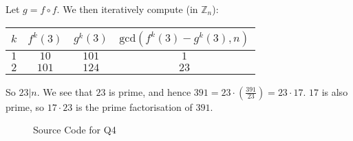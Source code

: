 Let $g=f\circ f$. We then iteratively compute (in $\mathbb{Z}_n$):

\begin{tabular}{|c|c|c|c|}
\hline
$k$ &$f^k(3)$ &$g^k(3)$ & $\text{gcd}(f^k(3)-g^k(3),n)$\\
\hline
$1$ & $10$ & $101$ & $1$ \\
$2$ & $101$ & $124$ & $23$ \\
\hline
\end{tabular}

So $23|n$. We see that $23$ is prime, and hence 
$391=23 \cdot \left( \frac{391}{23}\right)=23\cdot 17$.
$17$ is also prime, so $17\cdot 23$ is the prime factorisation
of $391$.

\begin{figure}[h]
\caption{Source Code for Q4}

\end{figure}
